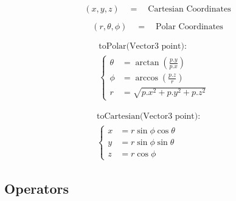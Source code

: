 \begin{minipage}{0.5\linewidth}
    \begin{equation*}
    (x, y, z) \quad = \quad \text{Cartesian Coordinates}
    \end{equation*}
\end{minipage}%
\begin{minipage}{0.5\linewidth}
    \begin{equation*}
    (r, \theta, \phi) \quad = \quad \text{Polar Coordinates}
    \end{equation*}
\end{minipage}


\begin{minipage}{0.5\linewidth}
    \begin{align*}
        \text{toPolar(Vector3 point): } \quad & \\
        \begin{cases}
            \theta &= \arctan\left(\frac{p.y}{p.x}\right) \\
            \phi &= \arccos\left(\frac{p.z}{r}\right) \\
            r &= \sqrt{p.x^2 + p.y^2 + p.z^2}
        \end{cases}
    \end{align*}
\end{minipage}%
\begin{minipage}{0.5\linewidth}
    \begin{align*}
        \text{toCartesian(Vector3 point): } \quad & \\
        \begin{cases}
            x &= r \sin\phi \cos\theta \\
            y &= r \sin\phi \sin\theta \\
            z &= r \cos\phi
        \end{cases}
    \end{align*}
\end{minipage}




\subsection*{Operators} 

